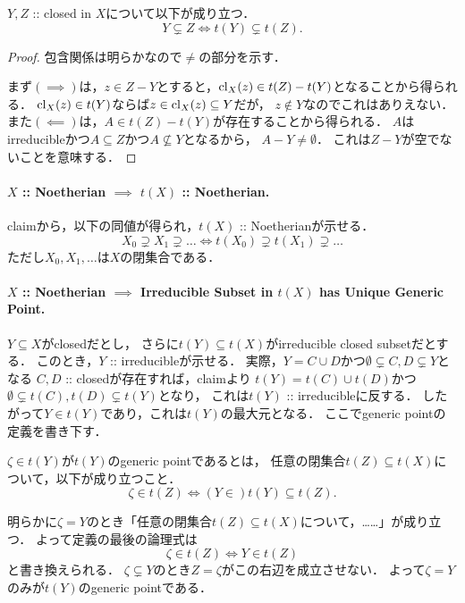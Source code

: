 \documentclass[a4paper]{jsarticle}
\begin{document}
    \begin{Claim}
        $Y,Z$ :: closed in $X$について以下が成り立つ．
        \[ Y \subsetneq Z \iff t(Y) \subsetneq t(Z). \]
    \end{Claim}
    \begin{proof}
        包含関係は明らかなので$\neq$の部分を示す．

        まず$(\implies)$は，$z \in Z-Y$とすると，$\operatorname{cl}_X(z) \in t(Z)-t(Y)$となることから得られる．
        $\operatorname{cl}_X(z) \in t(Y)$ならば$z \in \operatorname{cl}_X(z) \subseteq Y$だが，
        $z \not \in Y$なのでこれはありえない．
        また$(\impliedby)$は，$A \in t(Z)-t(Y)$が存在することから得られる．
        $A$はirreducibleかつ$A \subseteq Z$かつ$A \not \subseteq Y$となるから，
        $A-Y \neq \emptyset$．
        これは$Z-Y$が空でないことを意味する．
    \end{proof}

    \paragraph{$X$ :: Noetherian $\implies$ $t(X)$ :: Noetherian.}
    claimから，以下の同値が得られ，$t(X)$ :: Noetherianが示せる．
    \[ X_0 \supsetneq X_1 \supsetneq \dots \iff t(X_0) \supsetneq t(X_1) \supsetneq \dots \]
    ただし$X_0,X_1,\dots$は$X$の閉集合である．

    \paragraph{$X$ :: Noetherian $\implies$ Irreducible Subset in $t(X)$ has Unique Generic Point.}
    $Y \subseteq X$がclosedだとし，
    さらに$t(Y) \subseteq t(X)$がirreducible closed subsetだとする．
    このとき，$Y$ :: irreducibleが示せる．
    実際，$Y=C \cup D$かつ$\emptyset \subsetneq C,D \subsetneq Y$となる
    $C,D$ :: closedが存在すれば，claimより
    $t(Y)=t(C) \cup t(D)$かつ$\emptyset \subsetneq t(C),t(D) \subsetneq t(Y)$となり，
    これは$t(Y)$ :: irreducibleに反する．
    したがって$Y \in t(Y)$であり，これは$t(Y)$の最大元となる．
    ここでgeneric pointの定義を書き下す．
    \begin{Def}
        $\zeta \in t(Y)$が$t(Y)$のgeneric pointであるとは，
        任意の閉集合$t(Z) \subseteq t(X)$について，以下が成り立つこと．
        \[ \zeta \in t(Z) \iff (Y \in )t(Y) \subseteq t(Z). \]
    \end{Def}
    明らかに$\zeta=Y$のとき「任意の閉集合$t(Z) \subseteq t(X)$について，……」が成り立つ．
    よって定義の最後の論理式は
    \[ \zeta \in t(Z) \iff Y \in t(Z) \]
    と書き換えられる．
    $\zeta \subsetneq Y$のとき$Z=\zeta$がこの右辺を成立させない．
    よって$\zeta=Y$のみが$t(Y)$のgeneric pointである．
\end{document}
